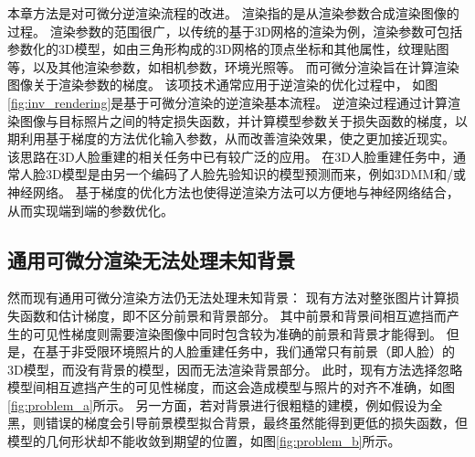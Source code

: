 本章方法是对可微分逆渲染流程的改进。
渲染指的是从渲染参数合成渲染图像的过程。
渲染参数的范围很广，以传统的基于3D网格的渲染为例，渲染参数可包括参数化的3D模型，如由三角形构成的3D网格的顶点坐标和其他属性，纹理贴图等，以及其他渲染参数，如相机参数，环境光照等。
而可微分渲染旨在计算渲染图像关于渲染参数的梯度。
该项技术通常应用于逆渲染的优化过程中，
如图\ref{fig:inv_rendering}是基于可微分渲染的逆渲染基本流程。
逆渲染过程通过计算渲染图像与目标照片之间的特定损失函数，并计算模型参数关于损失函数的梯度，以期利用基于梯度的方法优化输入参数，从而改善渲染效果，使之更加接近现实。
该思路在3D人脸重建的相关任务中已有较广泛的应用。
在3D人脸重建任务中，通常人脸3D模型是由另一个编码了人脸先验知识的模型预测而来，例如3DMM和/或神经网络。
基于梯度的优化方法也使得逆渲染方法可以方便地与神经网络结合，从而实现端到端的参数优化。

\subsection{通用可微分渲染无法处理未知背景}

然而现有通用可微分渲染方法仍无法处理未知背景：
现有方法对整张图片计算损失函数和估计梯度，即不区分前景和背景部分。
其中前景和背景间相互遮挡而产生的可见性梯度则需要渲染图像中同时包含较为准确的前景和背景才能得到。
但是，在基于非受限环境照片的人脸重建任务中，我们通常只有前景（即人脸）的3D模型，而没有背景的模型，因而无法渲染背景部分。
此时，现有方法选择忽略模型间相互遮挡产生的可见性梯度，而这会造成模型与照片的对齐不准确，如图\ref{fig:problem_a}所示。
另一方面，若对背景进行很粗糙的建模，例如假设为全黑，则错误的梯度会引导前景模型拟合背景，最终虽然能得到更低的损失函数，但模型的几何形状却不能收敛到期望的位置，如图\ref{fig:problem_b}所示。

